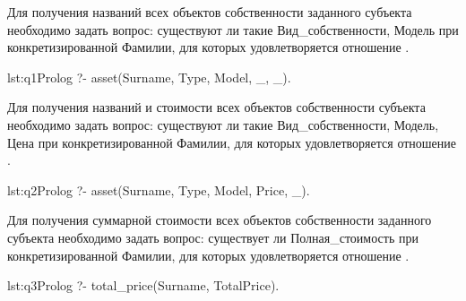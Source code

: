 Для получения названий всех объектов собственности заданного субъекта необходимо 
задать вопрос: существуют ли такие Вид\_собственности, Модель при конкретизированной 
Фамилии, для которых удовлетворяется отношение .

\begin{listing}[Вопрос 1]{lst:q1}{Prolog}
?- asset(Surname, Type, Model, \_, \_).
\end{listing}

Для получения названий и стоимости всех объектов собственности субъекта 
необходимо задать вопрос: существуют ли такие Вид\_собственности, 
Модель, Цена при конкретизированной Фамилии, для которых удовлетворяется отношение .

\begin{listing}[Вопрос 2]{lst:q2}{Prolog}
?- asset(Surname, Type, Model, Price, \_).
\end{listing}

Для получения суммарной стоимости всех объектов собственности заданного субъекта 
необходимо задать вопрос: существует ли Полная\_стоимость при конкретизированной 
Фамилии, для которых удовлетворяется отношение .

\begin{listing}[Вопрос 3]{lst:q3}{Prolog}
?- total\_price(Surname, TotalPrice).
\end{listing}
